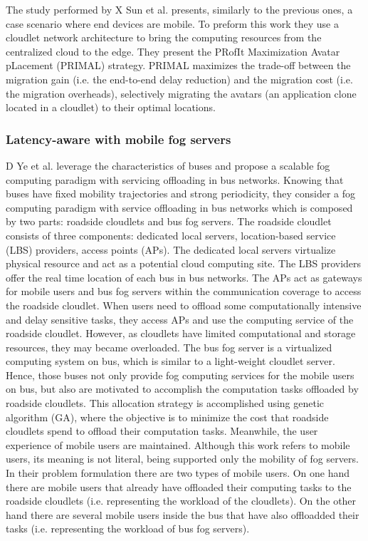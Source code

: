 \noindent\tab The study performed by X Sun et al. \cite{sun2016primal} presents, similarly to the previous ones, a case scenario where end devices are mobile. To preform this work they use a cloudlet network architecture to bring the computing resources from the centralized cloud to the edge. They present the PRofIt Maximization Avatar pLacement (PRIMAL) strategy. PRIMAL maximizes the trade-off between the migration gain (i.e. the end-to-end delay reduction) and the migration cost (i.e. the migration overheads), selectively migrating the avatars (an application clone located in a cloudlet) to their optimal locations. %

\subsubsection{Latency-aware with mobile fog servers}
D Ye et al. \cite{ye2016scalable} leverage the characteristics of buses and propose a scalable fog computing paradigm with servicing offloading in bus networks. Knowing that buses have fixed mobility trajectories and strong periodicity, they consider a fog computing paradigm with service offloading in bus networks which is composed by two parts: roadside cloudlets and bus fog servers. The roadside cloudlet consists of three components: dedicated local servers, location-based service (LBS) providers, access points (APs). The dedicated local servers virtualize physical resource and act as a potential cloud computing site. The LBS providers offer the real time location of each bus in bus networks. The APs act as gateways for mobile users and bus fog servers within the communication coverage to access the roadside cloudlet. When users need to offload some computationally intensive and delay sensitive tasks, they access APs and use the computing service of the roadside cloudlet. However, as cloudlets have limited computational and storage resources, they may became overloaded. The bus fog server is a virtualized computing system on bus, which is similar to a light-weight cloudlet server. Hence, those buses not only provide fog computing services for the mobile users on bus, but also are motivated to accomplish the computation tasks offloaded by roadside cloudlets. This allocation strategy is accomplished using genetic algorithm (GA), where the objective is to minimize the cost that roadside cloudlets spend to offload their computation tasks. Meanwhile, the user experience of mobile users are maintained. Although this work refers to mobile users, its meaning is not literal, being supported only the mobility of fog servers. In their problem formulation there are two types of mobile users. On one hand there are mobile users that already have offloaded their computing tasks to the roadside cloudlets (i.e. representing the workload of the cloudlets). On the other hand there are several mobile users inside the bus that have also offloadded their tasks (i.e. representing the workload of bus fog servers).\\
